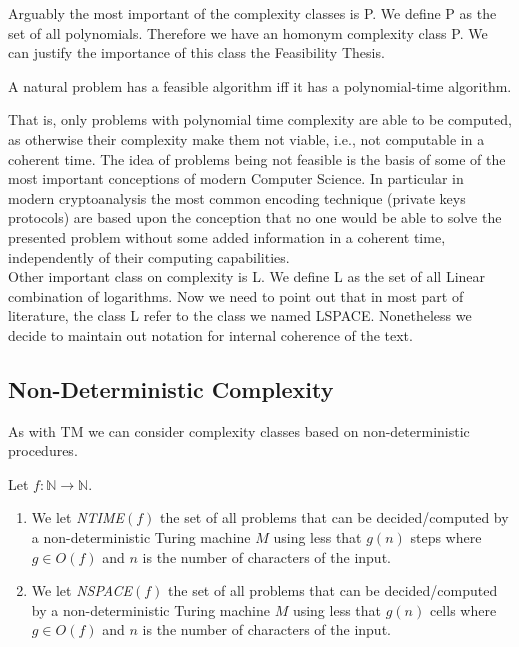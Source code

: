 Arguably the most important of the complexity classes is P. We define P as the set of all polynomials. Therefore we have an homonym complexity class P. We can justify the importance of this class the Feasibility Thesis.

\begin{thesis}
A natural problem has a feasible algorithm iff it has a polynomial-time algorithm.
\end{thesis}

That is, only problems with polynomial time complexity are able to be computed, as otherwise their complexity make them not viable, i.e., not computable in a coherent time. The idea of problems being not feasible is the basis of some of the most important conceptions of modern Computer Science. In particular in modern cryptoanalysis the most common encoding technique (private keys protocols) are based upon the conception that no one would be able to solve the presented problem without some added information in a coherent time, independently of their computing capabilities.\\

Other important class on complexity is L. We define L as the set of all Linear combination of logarithms. Now we need to point out that in most part of literature, the class L refer to the class we named LSPACE. Nonetheless we decide to maintain out notation for internal coherence of the text. 

\subsection{Non-Deterministic Complexity}

As with TM we can consider complexity classes based on non-deterministic procedures.

\begin{definition}
  Let $f: \mathbb{N}\to  \mathbb{N}$.
\begin{enumerate}
  \item We let \emph{NTIME}$(f)$  the set of all problems that can be decided/computed by a non-deterministic Turing machine $M$ using less that $g(n)$ steps where $g\in O(f)$ and $n$ is the number of characters of the input.  
  \item We let \emph{NSPACE}$(f)$  the set of all problems that can be decided/computed by a non-deterministic Turing machine $M$ using less that $g(n)$ cells where $g\in O(f)$ and $n$ is the number of characters of the input.  
\end{enumerate}
\end{definition}
  
